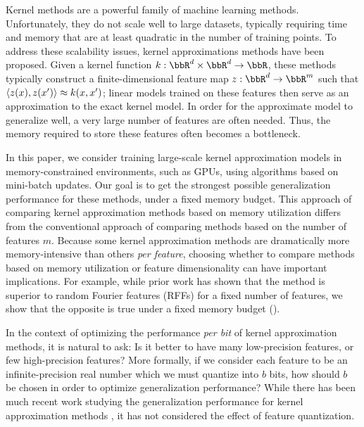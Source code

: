 
Kernel methods are a powerful family of machine learning methods.  Unfortunately, they do not scale well to large datasets, typically requiring time and memory that are at least quadratic in the number of training points. To address these scalability issues, kernel approximations methods have been proposed. Given a kernel function $k:\RR^d\times\RR^d\rightarrow \RR$, these methods typically construct a finite-dimensional feature map $z: \RR^d \rightarrow \RR^m$ such that $\langle z(x),z(x') \rangle \approx k(x,x')$; linear models trained on these features then serve as an approximation to the exact kernel model. In order for the approximate model to generalize well, a very large number of features are often needed. Thus, the memory required to store these features often becomes a bottleneck.

In this paper, we consider training large-scale kernel approximation models in memory-constrained environments, such as GPUs, using algorithms based on mini-batch updates. Our goal is to get the strongest possible generalization performance for these methods, under a fixed memory budget. This approach of comparing kernel approximation methods based on memory utilization differs from the conventional approach of comparing methods based on the number of features $m$. Because some kernel approximation methods are dramatically more memory-intensive than others \textit{per feature}, choosing whether to compare methods based on memory utilization or feature dimensionality can have important implications. For example, while prior work \citep{nysvsrff12} has shown that the \Nystrom method \citep{nystrom} is superior to random Fourier features (RFFs) \citep{rahimi07random} for a fixed number of features, we show that the opposite is true under a fixed memory budget (). 

In the context of optimizing the performance \textit{per bit} of kernel approximation methods, it is natural to ask: Is it better to have many low-precision features, or few high-precision features? More formally, if we consider each feature to be an infinite-precision real number which we must quantize into $b$ bits, how should $b$ be chosen in order to optimize generalization performance? While there has been much recent work studying the generalization performance for kernel approximation methods \citep{rudi17,avron17,musco17,bach17}, it has not considered the effect of feature quantization.

